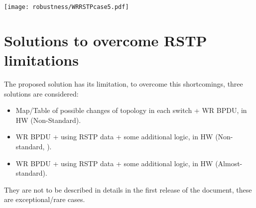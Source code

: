 \begin{center}
	\texttt{[image: robustness/WRRSTPcase5.pdf]}
	\label{fig:WRRSTPcase5}
\end{center}

\section{Solutions to overcome RSTP limitations}
The proposed solution has its limitation, to overcome this shortcomings, three
solutions are considered:
\begin{itemize}
  \item Map/Table of possible changes of topology in each
switch + WR BPDU, in HW (Non-Standard). 
  \item WR BPDU + using RSTP data + some additional logic, in HW (Non-standard,
).
  \item WR BPDU + using RSTP data + some additional logic, in HW
(Almost-standard).
\end{itemize}
They are not to be described in details in the first release of the document,
these are exceptional/rare cases.
